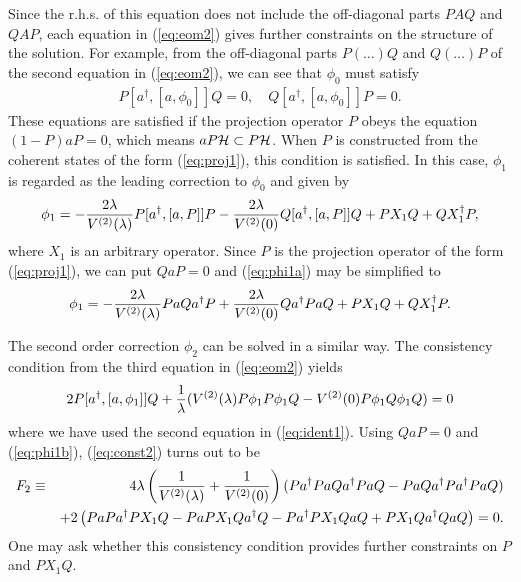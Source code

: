 \documentclass[a4paper,12pt]{article}
\begin{document}
Since the r.h.s. of this equation does not include the off-diagonal
parts $PAQ$ and $QAP$,
each equation in (\ref{eq:eom2}) gives
further constraints on  the structure of the solution.
For example, from the off-diagonal parts $P(\dots)Q$ and $Q(\dots)P$
of the second equation in (\ref{eq:eom2}),
we can see that $\phi_{0}$ must satisfy
\begin{eqnarray}
 P [a^{\dagger},[a,\phi_{0}]] Q=0, \quad
 Q [a^{\dagger},[a,\phi_{0}]] P=0.
\label{eq:condition1}
\end{eqnarray}
These equations are satisfied if the projection operator
$P$ obeys the equation $(1-P)aP=0$, which means
$a P{\cal H}\subset P{\cal H}$.
When $P$ is constructed
from the coherent states of the form (\ref{eq:proj1}),
this condition is satisfied.
In this case, $\phi_1$ is regarded as the leading correction to $\phi_0$
and given by
\begin{equation}
 \phi_{1}=-{2\lambda\over V^{(2)}(\lambda)} P[a^{\dagger},[a,P]]P
-{2\lambda\over V^{(2)}(0)} Q[a^{\dagger},[a,P]]Q
+PX_{1}Q+QX_{1}^{\dagger}P,
\label{eq:phi1a}
\end{equation}
where $X_{1}$ is an arbitrary operator.
Since $P$ is the projection operator of the form (\ref{eq:proj1}),
we can put $QaP=0$ and (\ref{eq:phi1a}) may be simplified to
\begin{equation}
 \phi_{1}=-{2\lambda\over V^{(2)}(\lambda)} PaQa^{\dagger}P
+{2\lambda\over V^{(2)}(0)} Qa^{\dagger}PaQ
+PX_{1}Q+QX_{1}^{\dagger}P.
\label{eq:phi1b}
\end{equation}

The second order correction $\phi_{2}$ can be solved in a similar way.
The consistency condition from the third equation in (\ref{eq:eom2}) yields
\begin{equation}
2P[a^{\dagger},[a,\phi_{1}]]Q+
{1\over\lambda}(V^{(2)}(\lambda)P\phi_{1}P\phi_{1}Q-V^{(2)}(0)
P\phi_{1}Q\phi_{1}Q)=0
\label{eq:const2}
\end{equation}
where we have used the second equation in (\ref{eq:ident1}).
Using $QaP=0$ and (\ref{eq:phi1b}), (\ref{eq:const2}) turns out to be
\begin{eqnarray}
F_{2}&\equiv& 4\lambda\left(
{1\over V^{(2)}(\lambda) }+{1\over V^{(2)}(0)}\right)
(Pa^{\dagger}PaQa^{\dagger}PaQ-PaQa^{\dagger}Pa^{\dagger}PaQ)
\nonumber\\
&& +2\left(
PaPa^{\dagger}PX_{1}Q-PaPX_{1}Qa^{\dagger}Q
-Pa^{\dagger}PX_{1}QaQ+PX_{1}Qa^{\dagger}QaQ
\right)=0.
\label{eq:cons2}
\end{eqnarray}
One may ask whether this consistency condition provides further
constraints on $P$ and $PX_{1}Q$.
\end{document}
